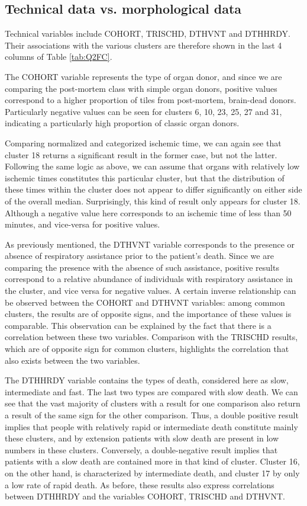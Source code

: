 \documentclass[a4paper, 11pt]{article}
\begin{document}
\begin{multicols}{2}
\subsection{Technical data vs. morphological data}
Technical variables include COHORT, TRISCHD, DTHVNT and DTHHRDY. Their associations with the various clusters are therefore shown in the last 4 columns of Table \ref{tab:Q2FC}. 

The COHORT variable represents the type of organ donor, and since we are comparing the post-mortem class with simple organ donors, positive values correspond to a higher proportion of tiles from post-mortem, brain-dead donors. Particularly negative values can be seen for clusters 6, 10, 23, 25, 27 and 31, indicating a particularly high proportion of classic organ donors.

Comparing normalized and categorized ischemic time, we can again see that cluster 18 returns a significant result in the former case, but not the latter. Following the same logic as above, we can assume that organs with relatively low ischemic times constitutes this particular cluster, but that the distribution of these times within the cluster does not appear to differ significantly on either side of the overall median. Surprisingly, this kind of result only appears for cluster 18. Although a negative value here corresponds to an ischemic time of less than 50 minutes, and vice-versa for positive values.

As previously mentioned, the DTHVNT variable corresponds to the presence or absence of respiratory assistance prior to the patient's death. Since we are comparing the presence with the absence of such assistance, positive results correspond to a relative abundance of individuals with respiratory assistance in the cluster, and vice versa for negative values. A certain inverse relationship can be observed between the COHORT and DTHVNT variables: among common clusters, the results are of opposite signs, and the importance of these values is comparable. This observation can be explained by the fact that there is a correlation between these two variables. Comparison with the TRISCHD results, which are of opposite sign for common clusters, highlights the correlation that also exists between the two variables. 

The DTHHRDY variable contains the types of death, considered here as slow, intermediate and fast. The last two types are compared with slow death. We can see that the vast majority of clusters with a result for one comparison also return a result of the same sign for the other comparison. Thus, a double positive result implies that people with relatively rapid or intermediate death constitute mainly these clusters, and by extension patients with slow death are present in low numbers in these clusters. Conversely, a double-negative result implies that patients with a slow death are contained more in that kind of cluster. Cluster 16, on the other hand, is characterized by intermediate death, and cluster 17 by only a low rate of rapid death. As before, these results also express correlations between DTHHRDY and the variables COHORT, TRISCHD and DTHVNT. 


\end{multicols}
\end{document}
